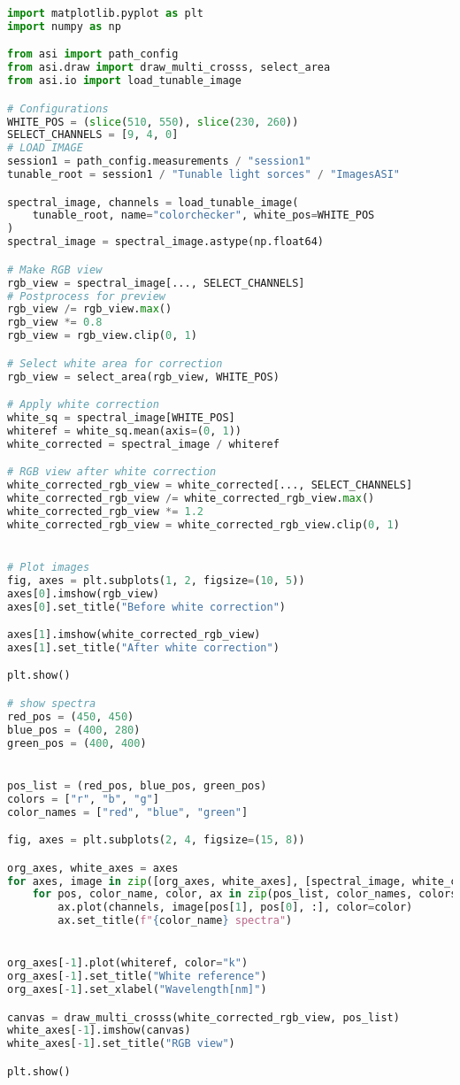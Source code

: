 \begin{lstlisting}[language=python, caption=White correction for Tunable Light Sources with small white reference, label={code:wc-tunable}]
import matplotlib.pyplot as plt
import numpy as np

from asi import path_config
from asi.draw import draw_multi_crosss, select_area
from asi.io import load_tunable_image

# Configurations
WHITE_POS = (slice(510, 550), slice(230, 260))
SELECT_CHANNELS = [9, 4, 0]
# LOAD IMAGE
session1 = path_config.measurements / "session1"
tunable_root = session1 / "Tunable light sorces" / "ImagesASI"

spectral_image, channels = load_tunable_image(
    tunable_root, name="colorchecker", white_pos=WHITE_POS
)
spectral_image = spectral_image.astype(np.float64)

# Make RGB view
rgb_view = spectral_image[..., SELECT_CHANNELS]
# Postprocess for preview
rgb_view /= rgb_view.max()
rgb_view *= 0.8
rgb_view = rgb_view.clip(0, 1)

# Select white area for correction
rgb_view = select_area(rgb_view, WHITE_POS)

# Apply white correction
white_sq = spectral_image[WHITE_POS]
whiteref = white_sq.mean(axis=(0, 1))
white_corrected = spectral_image / whiteref

# RGB view after white correction
white_corrected_rgb_view = white_corrected[..., SELECT_CHANNELS]
white_corrected_rgb_view /= white_corrected_rgb_view.max()
white_corrected_rgb_view *= 1.2
white_corrected_rgb_view = white_corrected_rgb_view.clip(0, 1)


# Plot images
fig, axes = plt.subplots(1, 2, figsize=(10, 5))
axes[0].imshow(rgb_view)
axes[0].set_title("Before white correction")

axes[1].imshow(white_corrected_rgb_view)
axes[1].set_title("After white correction")

plt.show()

# show spectra
red_pos = (450, 450)
blue_pos = (400, 280)
green_pos = (400, 400)


pos_list = (red_pos, blue_pos, green_pos)
colors = ["r", "b", "g"]
color_names = ["red", "blue", "green"]

fig, axes = plt.subplots(2, 4, figsize=(15, 8))

org_axes, white_axes = axes
for axes, image in zip([org_axes, white_axes], [spectral_image, white_corrected]):
    for pos, color_name, color, ax in zip(pos_list, color_names, colors, axes):
        ax.plot(channels, image[pos[1], pos[0], :], color=color)
        ax.set_title(f"{color_name} spectra")


org_axes[-1].plot(whiteref, color="k")
org_axes[-1].set_title("White reference")
org_axes[-1].set_xlabel("Wavelength[nm]")

canvas = draw_multi_crosss(white_corrected_rgb_view, pos_list)
white_axes[-1].imshow(canvas)
white_axes[-1].set_title("RGB view")

plt.show()
\end{lstlisting}